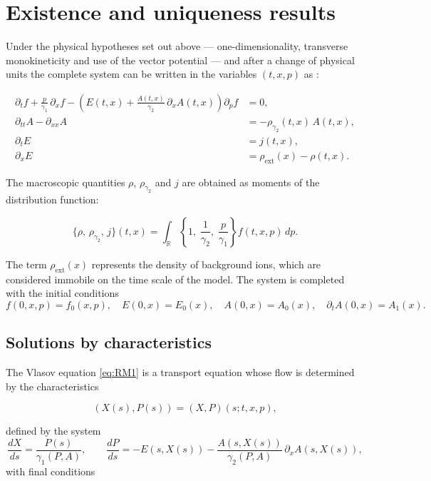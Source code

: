 \documentclass[11pt,a4paper,twoside,pdf]{article}
\numberwithin{equation}{section}
\begin{document}
\section{Existence and uniqueness results}

Under the physical hypotheses set out above --- one-dimensionality,
transverse monokineticity and use of the vector potential --- and after a change of physical units the complete system can be
written in the variables $(t,x,p)$ as \cite{carrillo2006global}:

\begin{align}
\partial_t f
+ \frac{p}{\gamma_1}\,\partial_x f
- \left( E(t,x)
+ \frac{A(t,x)}{\gamma_2}\,\partial_x A(t,x) \right)\partial_p f &= 0, \label{eq:RM1}\\[0.4em]
\partial_{tt} A - \partial_{xx} A &= - \rho_{\gamma_2}(t,x)\,A(t,x), \label{eq:RM2}\\[0.4em]
\partial_t E &= j(t,x), \label{eq:RM3}\\[0.4em]
\partial_x E &= \rho_{\mathrm{ext}}(x) - \rho(t,x). \label{eq:RM4}
\end{align}

The macroscopic quantities $\rho$, $\rho_{\gamma_2}$ and $j$ are obtained as moments
of the distribution function:


\[
\{\rho,\,\rho_{\gamma_2},\,j\}(t,x)
= \int_{\mathbb{R}} \left\{ 1,\;\frac{1}{\gamma_2},\;\frac{p}{\gamma_1} \right\} f(t,x,p)\,dp.
\]






The term $\rho_{\mathrm{ext}}(x)$ represents the density of background ions, which are
considered immobile on the time scale of the model. The system is completed with
the initial conditions
\begin{equation}
f(0,x,p)=f_0(x,p), \quad
E(0,x)=E_0(x), \quad
A(0,x)=A_0(x), \quad
\partial_t A(0,x)=A_1(x).
\label{eq:IC}
\end{equation}

\subsection{Solutions by characteristics}

The Vlasov equation \eqref{eq:RM1} is a transport equation whose flow is
determined by the characteristics \cite{romeroedp}


\[
(X(s),P(s)) = (X,P)(s;t,x,p),
\]


defined by the system
\begin{equation}
\frac{dX}{ds} = \frac{P(s)}{\gamma_1(P,A)}, \qquad
\frac{dP}{ds} = -E(s,X(s)) - \frac{A(s,X(s))}{\gamma_2(P,A)}\,\partial_x A(s,X(s)),
\label{eq:char}
\end{equation}
with final conditions
\end{document}
